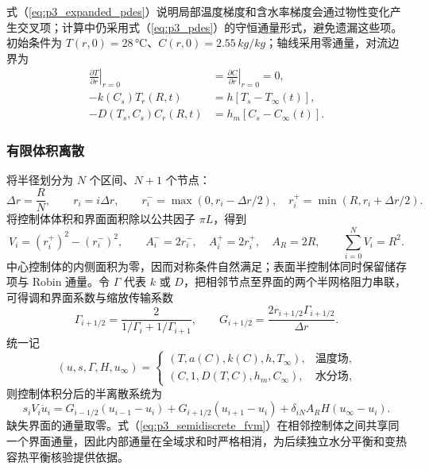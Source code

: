 \documentclass[withoutpreface,bwprint]{cumcmthesis}
\begin{document}
式（\ref{eq:p3_expanded_pdes}）说明局部温度梯度和含水率梯度会通过物性变化产生交叉项；计算中仍采用式（\ref{eq:p3_pdes}）的守恒通量形式，避免遗漏这些项。初始条件为 $T(r,0)=28\,\si{\celsius}$、$C(r,0)=2.55\,\si{kg/kg}$；轴线采用零通量，对流边界为
\begin{equation}
\begin{aligned}
\left.\frac{\partial T}{\partial r}\right|_{r=0}&=
\left.\frac{\partial C}{\partial r}\right|_{r=0}=0,\\
-k(C_s)T_r(R,t)&=h[T_s-T_\infty(t)],\\
-D(T_s,C_s)C_r(R,t)&=h_m[C_s-C_\infty(t)].
\end{aligned}
\label{eq:p3_boundary}
\end{equation}

\subsubsection{有限体积离散}

将半径划分为 $N$ 个区间、$N+1$ 个节点：
\begin{equation}
\Delta r=\frac{R}{N},\qquad r_i=i\Delta r,\qquad
r_i^-=\max(0,r_i-\Delta r/2),\quad
r_i^+=\min(R,r_i+\Delta r/2).
\label{eq:p3_grid_geometry}
\end{equation}
将控制体体积和界面面积除以公共因子 $\pi L$，得到
\begin{equation}
V_i=(r_i^+)^2-(r_i^-)^2,\qquad
A_i^-=2r_i^-,\quad A_i^+=2r_i^+,\quad A_R=2R,\qquad
\sum_{i=0}^{N}V_i=R^2.
\label{eq:p3_scaled_geometry}
\end{equation}
中心控制体的内侧面积为零，因而对称条件自然满足；表面半控制体同时保留储存项与 Robin 通量。令 $\Gamma$ 代表 $k$ 或 $D$，把相邻节点至界面的两个半网格阻力串联，可得调和界面系数与缩放传输系数
\begin{equation}
\Gamma_{i+1/2}=\frac{2}{1/\Gamma_i+1/\Gamma_{i+1}},\qquad
G_{i+1/2}=\frac{2r_{i+1/2}\Gamma_{i+1/2}}{\Delta r}.
\label{eq:p3_harmonic_conductance}
\end{equation}
统一记
\begin{equation}
(u,s,\Gamma,H,u_\infty)=
\begin{cases}
(T,a(C),k(C),h,T_\infty),&\text{温度场},\\
(C,1,D(T,C),h_m,C_\infty),&\text{水分场},
\end{cases}
\label{eq:p3_unified_variables}
\end{equation}
则控制体积分后的半离散系统为
\begin{equation}
s_iV_i\dot u_i=
G_{i-1/2}(u_{i-1}-u_i)+G_{i+1/2}(u_{i+1}-u_i)
+\delta_{iN}A_RH(u_\infty-u_i).
\label{eq:p3_semidiscrete_fvm}
\end{equation}
缺失界面的通量取零。式（\ref{eq:p3_semidiscrete_fvm}）在相邻控制体之间共享同一个界面通量，因此内部通量在全域求和时严格相消，为后续独立水分平衡和变热容热平衡核验提供依据。
\end{document}
